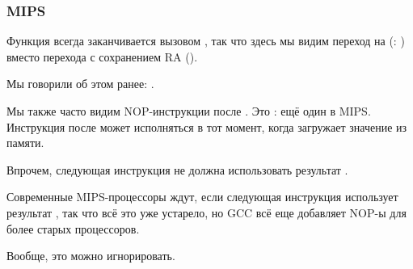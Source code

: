 \subsubsection{MIPS}




Функция всегда заканчивается вызовом \puts, так что здесь мы видим переход на \puts (: )
вместо перехода с сохранением \ac{RA} ().

Мы говорили об этом ранее: .

Мы также часто видим NOP-инструкции после .
Это : ещё один  в MIPS.
Инструкция после  может исполняться в тот момент, когда  загружает значение из памяти.

Впрочем, следующая инструкция не должна использовать результат .

Современные MIPS-процессоры ждут, если следующая инструкция использует результат , так что всё это уже
устарело, но GCC всё еще добавляет NOP-ы для более старых процессоров.

Вообще, это можно игнорировать.

